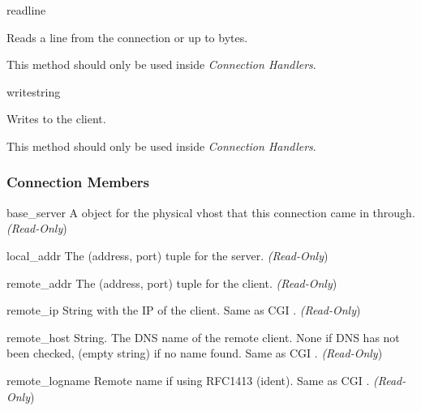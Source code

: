 \begin{methoddesc}[connection]{readline}{}

  Reads a line from the connection or up to  bytes.

  This method should only be used inside \emph{Connection Handlers}.

\end{methoddesc}

\begin{methoddesc}[connection]{write}{string}

  Writes  to the client.

  This method should only be used inside \emph{Connection Handlers}.

\end{methoddesc}

\subsubsection{Connection Members\label{pyapi-mpconn-mem}}

\begin{memberdesc}[connection]{base_server}
  A  object for the physical vhost that this connection came in
  through.
  \emph{(Read-Only})
\end{memberdesc}

\begin{memberdesc}[connection]{local_addr}
  The (address, port) tuple for the server.
  \emph{(Read-Only})
\end{memberdesc}

\begin{memberdesc}[connection]{remote_addr}
  The (address, port) tuple for the client.
  \emph{(Read-Only})
\end{memberdesc}

\begin{memberdesc}[connection]{remote_ip}
  String with the IP of the client. Same as CGI .
  \emph{(Read-Only})
\end{memberdesc}

\begin{memberdesc}[connection]{remote_host}
  String. The DNS name of the remote client. None if DNS has not been
  checked,  (empty string) if no name found. Same as CGI .
  \emph{(Read-Only})
\end{memberdesc}

\begin{memberdesc}[connection]{remote_logname}
  Remote name if using RFC1413 (ident). Same as CGI .
  \emph{(Read-Only})
\end{memberdesc}

